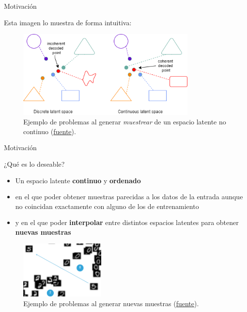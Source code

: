 \begin{frame}{Motivación}

Esta imagen lo muestra de forma intuitiva:

\begin{figure}
    \centering
    \includegraphics[width=0.8\textwidth]{Slides/figures/02_Metodos_Generativos/ae vs vae sampling.png}
    \caption{Ejemplo de problemas al generar \textit{muestrear} de un espacio latente no continuo (\href{https://www.researchgate.net/publication/349939162/figure/fig1/AS:999624672305152@1615340502225/Simplified-representation-of-the-compression-resulting-from-a-vanilla-Autoencoder-left.ppm}{fuente}).}
    \label{fig:enter-label}
\end{figure}

\end{frame}


\begin{frame}{Motivación}

¿Qué es lo deseable?

\begin{itemize}
    \item Un espacio latente \textbf{continuo} y \textbf{ordenado}
    \item en el que poder obtener muestras parecidas a los datos de la entrada aunque no coincidan exactamente con alguno de los de entrenamiento
    \item y en el que poder \textbf{interpolar} entre distintos espacios latentes para obtener \textbf{nuevas muestras}
\end{itemize}

\begin{figure}
    \centering
    \includegraphics[width=0.38\textwidth]{Slides/figures/02_Metodos_Generativos/ae-desired-latent-space.png}
    \caption{Ejemplo de problemas al generar nuevas muestras (\href{https://indico.ictp.it/event/8674/session/155/contribution/1121/material/slides/0.pdf}{fuente}).}
    \label{fig:enter-label}
\end{figure}

\end{frame}


